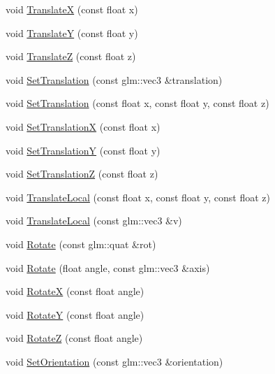 \begin{DoxyCompactItemize}
void \mbox{\hyperlink{classec_1_1_transform3_d_a0c1e55c9edcd7cb53199fd05ba111099}{TranslateX}} (const float x)
\item 
void \mbox{\hyperlink{classec_1_1_transform3_d_ae95b02e45148ca35e98ae54d23b01904}{TranslateY}} (const float y)
\item 
void \mbox{\hyperlink{classec_1_1_transform3_d_a33c653dddfd16ec7481f1b1313a4505e}{TranslateZ}} (const float z)
\item 
void \mbox{\hyperlink{classec_1_1_transform3_d_a3a2ebde1bdb7b79e080deaee7555e251}{Set\+Translation}} (const glm\+::vec3 \&translation)
\item 
void \mbox{\hyperlink{classec_1_1_transform3_d_a14c627a2eea894334e652ba9046bdcae}{Set\+Translation}} (const float x, const float y, const float z)
\item 
void \mbox{\hyperlink{classec_1_1_transform3_d_a150e25babd8e2aeeb650c768e4d5d448}{Set\+TranslationX}} (const float x)
\item 
void \mbox{\hyperlink{classec_1_1_transform3_d_a93cbe1baa33972865b10554fbacfddec}{Set\+TranslationY}} (const float y)
\item 
void \mbox{\hyperlink{classec_1_1_transform3_d_af7a125c99afbd7e53cf7b905c2ab1db4}{Set\+TranslationZ}} (const float z)
\item 
void \mbox{\hyperlink{classec_1_1_transform3_d_a84df51411133b3402b75fa05bd51faae}{Translate\+Local}} (const float x, const float y, const float z)
\item 
void \mbox{\hyperlink{classec_1_1_transform3_d_a44ece37c7f56329840c2f92ae695e9a2}{Translate\+Local}} (const glm\+::vec3 \&v)
\item 
void \mbox{\hyperlink{classec_1_1_transform3_d_ae2675da2f17fe145cc199412d85777d5}{Rotate}} (const glm\+::quat \&rot)
\item 
void \mbox{\hyperlink{classec_1_1_transform3_d_acaaea3ccdff9e23f1edf6f9fed054afe}{Rotate}} (float angle, const glm\+::vec3 \&axis)
\item 
void \mbox{\hyperlink{classec_1_1_transform3_d_a04e4eaf695ba795bac09e8fa43c0a462}{RotateX}} (const float angle)
\item 
void \mbox{\hyperlink{classec_1_1_transform3_d_a71e31dbecd1bfad8754c7b3bca691876}{RotateY}} (const float angle)
\item 
void \mbox{\hyperlink{classec_1_1_transform3_d_aff76dc65f161ff8401976561772dd2fc}{RotateZ}} (const float angle)
\item 
void \mbox{\hyperlink{classec_1_1_transform3_d_a752381826edcad395fedaa4c9ced5da2}{Set\+Orientation}} (const glm\+::vec3 \&orientation)

\end{DoxyCompactItemize}
